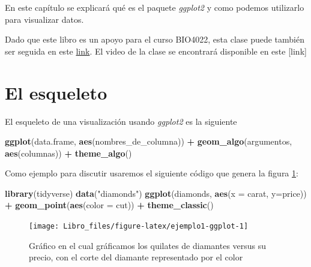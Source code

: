 \documentclass[]{book}
\newenvironment{Shaded}{\begin{snugshade}}{\end{snugshade}}
\newcommand{\DataTypeTok}[1]{\textcolor[rgb]{0.13,0.29,0.53}{#1}}
\newcommand{\KeywordTok}[1]{\textcolor[rgb]{0.13,0.29,0.53}{\textbf{#1}}}
\newcommand{\NormalTok}[1]{#1}
\newcommand{\OperatorTok}[1]{\textcolor[rgb]{0.81,0.36,0.00}{\textbf{#1}}}
\newcommand{\StringTok}[1]{\textcolor[rgb]{0.31,0.60,0.02}{#1}}
\begin{document}
En este capítulo se explicará qué es el paquete \emph{ggplot2}
\citep{Wickhamggplot} y como podemos utilizarlo para visualizar datos.

Dado que este libro es un apoyo para el curso BIO4022, esta clase puede
también ser seguida en este
\href{https://derek-corcoran-barrios.github.io/Clase4/Clase4Visualizacion}{link}.
El video de la clase se encontrará disponible en este {[}link{]}

\hypertarget{el-esqueleto}{%
\section{El esqueleto}\label{el-esqueleto}}

El esqueleto de una visualización usando \emph{ggplot2} es la siguiente

\begin{Shaded}
\begin{Highlighting}[]
\KeywordTok{ggplot}\NormalTok{(data.frame, }\KeywordTok{aes}\NormalTok{(nombres_de_columna)) }\OperatorTok{+}\StringTok{ }\KeywordTok{geom_algo}\NormalTok{(argumentos, }
    \KeywordTok{aes}\NormalTok{(columnas)) }\OperatorTok{+}\StringTok{ }\KeywordTok{theme_algo}\NormalTok{()}
\end{Highlighting}
\end{Shaded}

Como ejemplo para discutir usaremos el siguiente código que genera la
figura \ref{fig:ejemplo1-ggplot}:

\begin{Shaded}
\begin{Highlighting}[]
\KeywordTok{library}\NormalTok{(tidyverse)}
\KeywordTok{data}\NormalTok{(}\StringTok{"diamonds"}\NormalTok{)}
\KeywordTok{ggplot}\NormalTok{(diamonds, }\KeywordTok{aes}\NormalTok{(}\DataTypeTok{x =}\NormalTok{ carat, }\DataTypeTok{y=}\NormalTok{price)) }\OperatorTok{+}\StringTok{ }\KeywordTok{geom_point}\NormalTok{(}\KeywordTok{aes}\NormalTok{(}\DataTypeTok{color =}\NormalTok{ cut)) }\OperatorTok{+}\StringTok{ }\KeywordTok{theme_classic}\NormalTok{()}
\end{Highlighting}
\end{Shaded}

\begin{figure}

{\centering \texttt{[image: Libro\_files/figure-latex/ejemplo1-ggplot-1]} 

}

\caption{Gráfico en el cual gráficamos los quilates de diamantes versus su precio, con el corte del diamante representado por el color}\label{fig:ejemplo1-ggplot}
\end{figure}
\end{document}

